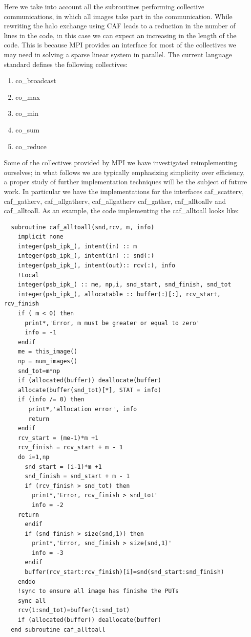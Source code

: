 \documentclass{IOS-Book-Article}
\begin{document}
Here we take into account all the subroutines performing collective
communications, in which all images take part in the
communication. While rewriting the halo exchange using CAF leads to a
reduction in the number of lines in the code, in this case we can
expect an increasing in the length of the code. This is because MPI
provides an interface for most of the collectives we may need in
solving a sparse linear system in parallel.
The current language standard defines the following collectives:
\begin{enumerate}
\item co\_broadcast
\item co\_max
\item co\_min
\item co\_sum
\item co\_reduce
\end{enumerate}
Some of the collectives provided by MPI  we have investigated
reimplementing ourselves; in what follows we are typically emphasizing
simplicity over efficiency, a proper study of further implementation
techniques will be the subject of future work. In particular 
we have the implementations for the interfaces caf\_scatterv,
caf\_gatherv, caf\_allgatherv, caf\_allgatherv caf\_gather,
caf\_alltoallv and caf\_alltoall.  
As an example, the code implementing the caf\_alltoall looks like:
\lstset{language=Fortran} 
\iffalse
{\small
\begin{lstlisting}
  subroutine caf_alltoall(snd,rcv, m, info)
    implicit none
    integer(psb_ipk_), intent(in) :: m
    integer(psb_ipk_), intent(in) :: snd(:)
    integer(psb_ipk_), intent(out):: rcv(:), info
    !Local
    integer(psb_ipk_) :: me, np,i, snd_start, snd_finish, snd_tot
    integer(psb_ipk_), allocatable :: buffer(:)[:], rcv_start, rcv_finish
    if ( m < 0) then
      print*,'Error, m must be greater or equal to zero'
      info = -1
    endif
    me = this_image()
    np = num_images()
    snd_tot=m*np
    if (allocated(buffer)) deallocate(buffer)
    allocate(buffer(snd_tot)[*], STAT = info)
    if (info /= 0) then
       print*,'allocation error', info
       return
    endif
    rcv_start = (me-1)*m +1
    rcv_finish = rcv_start + m - 1
    do i=1,np
      snd_start = (i-1)*m +1 
      snd_finish = snd_start + m - 1
      if (rcv_finish > snd_tot) then
        print*,'Error, rcv_finish > snd_tot'
        info = -2 
	return
      endif
      if (snd_finish > size(snd,1)) then
        print*,'Error, snd_finish > size(snd,1)'
        info = -3 
      endif
      buffer(rcv_start:rcv_finish)[i]=snd(snd_start:snd_finish)
    enddo
    !sync to ensure all image has finishe the PUTs 
    sync all
    rcv(1:snd_tot)=buffer(1:snd_tot)
    if (allocated(buffer)) deallocate(buffer)
  end subroutine caf_alltoall
\end{lstlisting}}
\end{document}
